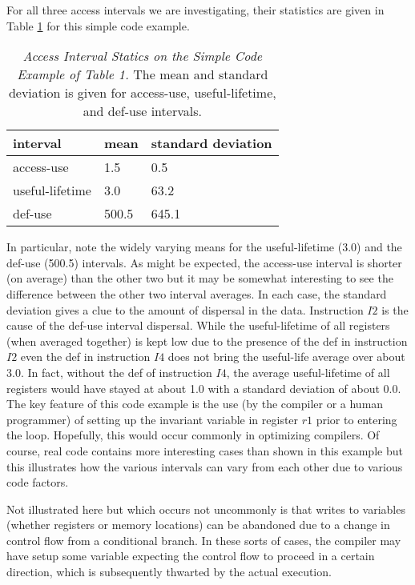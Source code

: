 \documentclass[10pt,dvips]{article}
\begin{document}
For all three access intervals we are investigating, their statistics
are given in Table \ref{tab:stats} for this simple code example.
%
\begin{table}
\begin{center}
\caption{{\em Access Interval Statics on the 
Simple Code Example of Table 1.}
The mean and standard deviation is given for access-use, useful-lifetime,
and def-use intervals.}
\label{tab:stats}
\vspace{+0.1in}
\begin{tabular}{l|l|l}
\hline 
interval&mean&standard deviation\\
\hline 
\hline 
access-use&1.5&0.5\\
useful-lifetime&3.0&63.2\\
def-use&500.5&645.1\\
\hline
\end{tabular}
\end{center}
\end{table}
%
In particular, note the widely varying means for the useful-lifetime
(3.0) and the def-use (500.5) intervals.
As might be expected, the access-use interval is shorter (on average)
than the other two but it may be somewhat interesting to see the
difference between the other two interval averages.
In each case, the standard deviation gives a clue to the amount
of dispersal in the data.  Instruction $ I2 $ is the cause of the
def-use interval dispersal.
While the useful-lifetime of all registers (when averaged together)
is kept low due to the presence of the def in instruction $ I2 $
even the def in instruction $ I4 $ does not bring the useful-life
average over about 3.0.  In fact, without the def of instruction $ I4 $,
the average useful-lifetime of all registers would have stayed at
about 1.0 with a standard deviation of about 0.0.
The key feature of this code example is the use (by the compiler or
a human programmer) of setting up the invariant variable in register $ r1 $
prior to entering the loop.
Hopefully, this would occur commonly in optimizing compilers.
Of course, real code contains more interesting cases than shown
in this example but this illustrates how the various intervals
can vary from each other due to various code factors.

Not illustrated here but which occurs not uncommonly is that
writes to variables (whether registers or memory locations)
can be abandoned due to a change in control flow from a conditional
branch.  In these sorts of cases, the compiler may have setup some
variable expecting the control flow to proceed in a certain direction,
which is subsequently thwarted by the actual execution.
%
%
\end{document}
